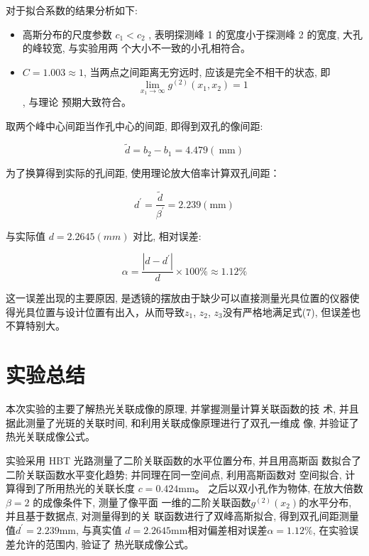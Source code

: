 \documentclass[12pt,a4paper]{article}
\newcommand{\be}[1]{
    \begin{equation}
        #1
    \end{equation}
}
\begin{document}
对于拟合系数的结果分析如下:
\begin{itemize}
\item 高斯分布的尺度参数 $c_1 < c_2$ , 表明探测峰 1 的宽度小于探测峰 2 的宽度, 大孔的峰较宽, 与实验用两
个大小不一致的小孔相符合。
\item $C = 1.003 \approx 1$, 当两点之间距离无穷远时, 应该是完全不相干的状态, 即 $$\lim _{x_{1} \rightarrow \infty} g^{(2)}\left(x_{1}, x_{2}\right)=1$$, 与理论
预期大致符合。
\end{itemize}
取两个峰中心间距当作孔中心的间距, 即得到双孔的像间距:
\be{\tilde{d}=b_{2}-b_{1}=4.479(\mathrm{~mm})}
为了换算得到实际的孔间距, 使用理论放大倍率计算双孔间距：
\be{d^{\prime}=\frac{\tilde{d}}{\beta^{\prime}}=2.239(\mathrm{mm})}
与实际值 $d = 2.2645(mm)$ 对比, 相对误差:
\be{\alpha=\frac{|d-d^{\prime}|}{d} \times 100 \% \approx 1.12 \%}
这一误差出现的主要原因, 是透镜的摆放由于缺少可以直接测量光具位置的仪器使得光具位置与设计位置有出入，从而导致$z_1$, $z_2$, $z_3$没有严格地满足式(7), 但误差也不算特别大。
\section{实验总结}
本次实验的主要了解热光关联成像的原理, 并掌握测量计算关联函数的技
术, 并且据此测量了光斑的关联时间, 和利用关联成像原理进行了双孔一维成
像, 并验证了热光关联成像公式。

实验采用 HBT 光路测量了二阶关联函数的水平位置分布, 并且用高斯函
数拟合了二阶关联函数水平变化趋势; 并同理在同一空间点, 利用高斯函数对
空间拟合, 计算得到了所用热光的关联长度 $c = 0.424 \mathrm{mm}$。
之后以双小孔作为物体, 在放大倍数 $\beta = 2$ 的成像条件下, 测量了像平面
一维的二阶关联函数$ g^{(2)}(x_2) $的水平分布, 并且基于数据点, 对测量得到的关
联函数进行了双峰高斯拟合, 得到双孔间距测量值$ d^{\prime} = 2.239\mathrm{mm}$, 与真实值
$d = 2.2645\mathrm{mm} $相对偏差相对误差$ \alpha = 1.12\%$, 
在实验误差允许的范围内, 验证了
热光联成像公式。

\printbibliography %
\end{document}
